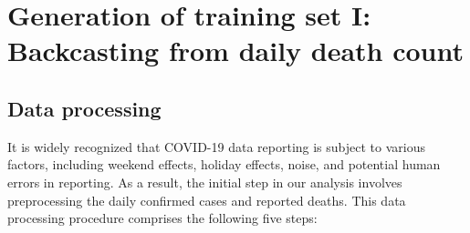 \documentclass[sn-mathphys,Numbered]{sn-jnl}
\begin{document}
\section{Generation of training set I: Backcasting from daily death count}
\label{backcast}


\subsection{Data processing}
It is widely recognized that COVID-19 data reporting is subject to various factors, including weekend effects, holiday effects, noise, and potential human errors in reporting. As a result, the initial step in our analysis involves preprocessing the daily confirmed cases and reported deaths. This data processing procedure comprises the following five steps:
\end{document}
